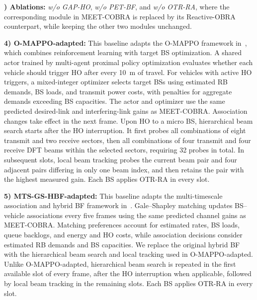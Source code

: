 \documentclass[conference, a4paper]{IEEEtran}
\newcommand{\rev}[1]{\textcolor{revisioncolor}{{}#1}}
\newif\ifshowdeletions
\newcommand{\currentdel}[1]{\ifshowdeletions\textcolor{deletioncolor}{\sout{#1}}\fi}
\theoremstyle{remark}
\begin{document}
\textbf{\currentdel{4}) Ablations:} \emph{w/o GAP-HO}, \emph{w/o PET-BF}, and \emph{w/o OTR-RA}, where the corresponding module in MEET-COBRA is replaced by its Reactive-OBRA counterpart, while keeping the other two modules unchanged.

\rev{\textbf{4) O-MAPPO-adapted:} This baseline adapts the O-MAPPO framework in~\cite{wang2024joint}, which combines reinforcement learning with target BS optimization. A shared actor trained by multi-agent proximal policy optimization evaluates whether each vehicle should trigger HO after every 10~m of travel. For vehicles with active HO triggers, a mixed-integer optimizer selects target BSs using estimated RB demands, BS loads, and transmit power costs, with penalties for aggregate demands exceeding BS capacities. The actor and optimizer use the same predicted desired-link and interfering-link gains as MEET-COBRA. Association changes take effect in the next frame. Upon HO to a micro BS, hierarchical beam search starts after the HO interruption. It first probes all combinations of eight transmit and two receive sectors, then all combinations of four transmit and four receive DFT beams within the selected sectors, requiring 32 probes in total. In subsequent slots, local beam tracking probes the current beam pair and four adjacent pairs differing in only one beam index, and then \rev{retains} the pair with the highest measured gain. Each BS applies OTR-RA in every slot.}

\rev{\textbf{5) MTS-GS-HBF-adapted:} This baseline adapts the multi-timescale association and hybrid BF framework in~\cite{heydarian2025multitimescale}. Gale--Shapley matching updates BS--vehicle associations every five frames using the same predicted channel gains as MEET-COBRA. Matching preferences account for estimated rates, BS loads, queue backlogs, and energy and HO costs, while association decisions consider estimated RB demands and BS capacities. We replace the original hybrid BF with the hierarchical beam search and local tracking used in O-MAPPO-adapted. Unlike O-MAPPO-adapted, hierarchical beam search is repeated in the first available slot of every frame, after the HO interruption when applicable, followed by local beam tracking in the remaining slots. Each BS applies OTR-RA in every slot.}
\end{document}
